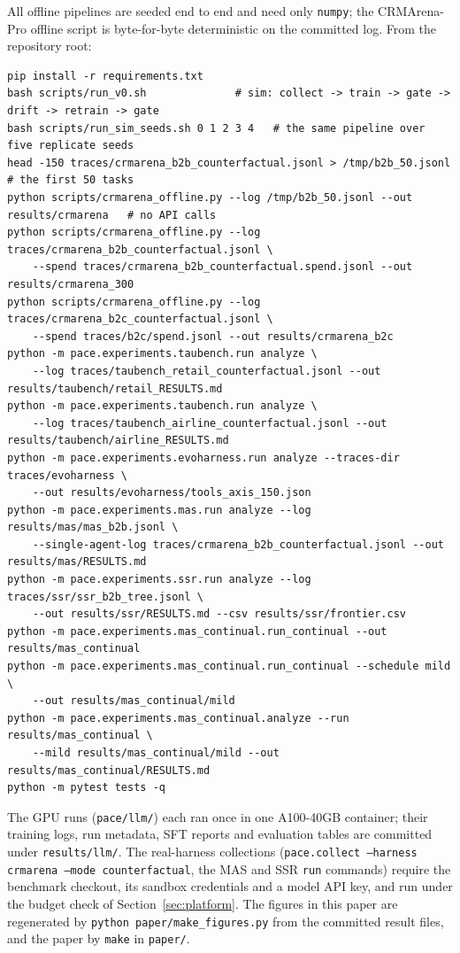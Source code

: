 \documentclass[10pt]{article}
\newcommand{\code}[1]{\texttt{#1}}
\begin{document}
All offline pipelines are seeded end to end and need only \code{numpy}; the CRMArena-Pro offline script is byte-for-byte deterministic on the committed log. From the repository root:
{\small\begin{verbatim}
pip install -r requirements.txt
bash scripts/run_v0.sh              # sim: collect -> train -> gate -> drift -> retrain -> gate
bash scripts/run_sim_seeds.sh 0 1 2 3 4   # the same pipeline over five replicate seeds
head -150 traces/crmarena_b2b_counterfactual.jsonl > /tmp/b2b_50.jsonl   # the first 50 tasks
python scripts/crmarena_offline.py --log /tmp/b2b_50.jsonl --out results/crmarena   # no API calls
python scripts/crmarena_offline.py --log traces/crmarena_b2b_counterfactual.jsonl \
    --spend traces/crmarena_b2b_counterfactual.spend.jsonl --out results/crmarena_300
python scripts/crmarena_offline.py --log traces/crmarena_b2c_counterfactual.jsonl \
    --spend traces/b2c/spend.jsonl --out results/crmarena_b2c
python -m pace.experiments.taubench.run analyze \
    --log traces/taubench_retail_counterfactual.jsonl --out results/taubench/retail_RESULTS.md
python -m pace.experiments.taubench.run analyze \
    --log traces/taubench_airline_counterfactual.jsonl --out results/taubench/airline_RESULTS.md
python -m pace.experiments.evoharness.run analyze --traces-dir traces/evoharness \
    --out results/evoharness/tools_axis_150.json
python -m pace.experiments.mas.run analyze --log results/mas/mas_b2b.jsonl \
    --single-agent-log traces/crmarena_b2b_counterfactual.jsonl --out results/mas/RESULTS.md
python -m pace.experiments.ssr.run analyze --log traces/ssr/ssr_b2b_tree.jsonl \
    --out results/ssr/RESULTS.md --csv results/ssr/frontier.csv
python -m pace.experiments.mas_continual.run_continual --out results/mas_continual
python -m pace.experiments.mas_continual.run_continual --schedule mild \
    --out results/mas_continual/mild
python -m pace.experiments.mas_continual.analyze --run results/mas_continual \
    --mild results/mas_continual/mild --out results/mas_continual/RESULTS.md
python -m pytest tests -q
\end{verbatim}}
The GPU runs (\code{pace/llm/}) each ran once in one A100-40GB container; their training logs, run metadata, SFT reports and evaluation tables are committed under \code{results/llm/}. The real-harness collections (\code{pace.collect --harness crmarena --mode counterfactual}, the MAS and SSR \code{run} commands) require the benchmark checkout, its sandbox credentials and a model API key, and run under the budget check of Section~\ref{sec:platform}. The figures in this paper are regenerated by \code{python paper/make\_figures.py} from the committed result files, and the paper by \code{make} in \code{paper/}.
\end{document}
